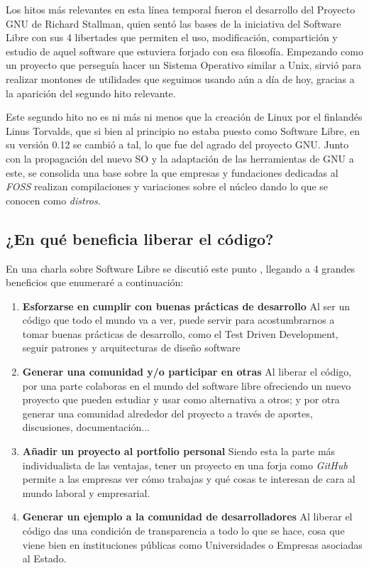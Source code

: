 Los hitos más relevantes en esta línea temporal fueron el desarrollo del Proyecto GNU de Richard Stallman, quien  sentó las bases de la iniciativa del Software Libre con sus 4 libertades \cite{fsf-philosophy} que permiten el uso, modificación, compartición y estudio de aquel software que estuviera forjado con esa filosofía. Empezando como un proyecto que perseguía hacer un Sistema Operativo similar a Unix, sirvió para realizar montones de utilidades que seguimos usando aún a día de hoy, gracias a la aparición del segundo hito relevante.

Este segundo hito no es ni más ni menos que la creación de Linux por el finlandés Linus Torvalds, que si bien al principio no estaba puesto como Software Libre, en su versión 0.12 \cite{linux-releasenotes0.12} se cambió a tal, lo que fue del agrado del proyecto GNU. Junto con la propagación del nuevo SO y la adaptación de las herramientas de GNU a este, se consolida una base sobre la que empresas y fundaciones dedicadas al \textit{FOSS} realizan compilaciones y variaciones sobre el núcleo dando lo que se conocen como \textit{distros}.

\subsection{¿En qué beneficia liberar el código?}
En una charla sobre Software Libre se discutió este punto \cite{osl-charla-liberatucodigo}, llegando a 4 grandes beneficios que enumeraré a continuación:

\begin{enumerate}
	\item \textbf{Esforzarse en cumplir con buenas prácticas de desarrollo} Al ser un código que todo el mundo va a ver, puede servir para acostumbrarnos a tomar buenas prácticas de desarrollo, como el Test Driven Development, seguir patrones y arquitecturas de diseño software
	\item \textbf{Generar una comunidad y/o participar en otras} Al liberar el código, por una parte colaboras en el mundo del software libre ofreciendo un nuevo proyecto que pueden estudiar y usar como alternativa a otros; y por otra generar una comunidad alrededor del proyecto a través de aportes, discusiones, documentación...
	\item \textbf{Añadir un proyecto al portfolio personal} Siendo esta la parte más individualista de las ventajas, tener un proyecto en una forja como \textit{GitHub} permite a las empresas ver cómo trabajas y qué cosas te interesan de cara al mundo laboral y empresarial.
	\item \textbf{Generar un ejemplo a la comunidad de desarrolladores} Al liberar el código das una condición de transparencia a todo lo que se hace, cosa que viene bien en instituciones públicas como Universidades o Empresas asociadas al Estado.
\end{enumerate}



